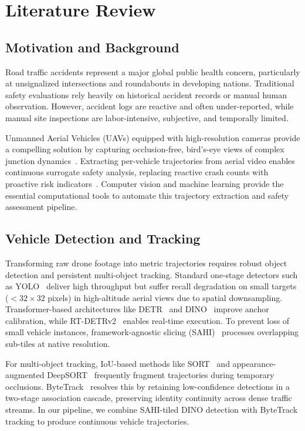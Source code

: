 \chapter{Literature Review}
\label{chap:lit_review}

\section{Motivation and Background}

Road traffic accidents represent a major global public health concern, particularly at unsignalized intersections and roundabouts in developing nations. Traditional safety evaluations rely heavily on historical accident records or manual human observation. However, accident logs are reactive and often under-reported, while manual site inspections are labor-intensive, subjective, and temporally limited. 

Unmanned Aerial Vehicles (UAVs) equipped with high-resolution cameras provide a compelling solution by capturing occlusion-free, bird's-eye views of complex junction dynamics~\cite{drone_roundabout, highway_tracking}. Extracting per-vehicle trajectories from aerial video enables continuous surrogate safety analysis, replacing reactive crash counts with proactive risk indicators~\cite{laureshyn2010}. Computer vision and machine learning provide the essential computational tools to automate this trajectory extraction and safety assessment pipeline.

\section{Vehicle Detection and Tracking}

Transforming raw drone footage into metric trajectories requires robust object detection and persistent multi-object tracking. Standard one-stage detectors such as YOLO~\cite{yolov8_ultralytics} deliver high throughput but suffer recall degradation on small targets ($< 32 \times 32$ pixels) in high-altitude aerial views due to spatial downsampling. Transformer-based architectures like DETR~\cite{detr} and DINO~\cite{dino} improve anchor calibration, while RT-DETRv2~\cite{rtdetr} enables real-time execution. To prevent loss of small vehicle instances, framework-agnostic slicing (SAHI)~\cite{sahi} processes overlapping sub-tiles at native resolution.

For multi-object tracking, IoU-based methods like SORT~\cite{sort} and appearance-augmented DeepSORT~\cite{deepsort} frequently fragment trajectories during temporary occlusions. ByteTrack~\cite{bytetrack} resolves this by retaining low-confidence detections in a two-stage association cascade, preserving identity continuity across dense traffic streams. In our pipeline, we combine SAHI-tiled DINO detection with ByteTrack tracking to produce continuous vehicle trajectories.


